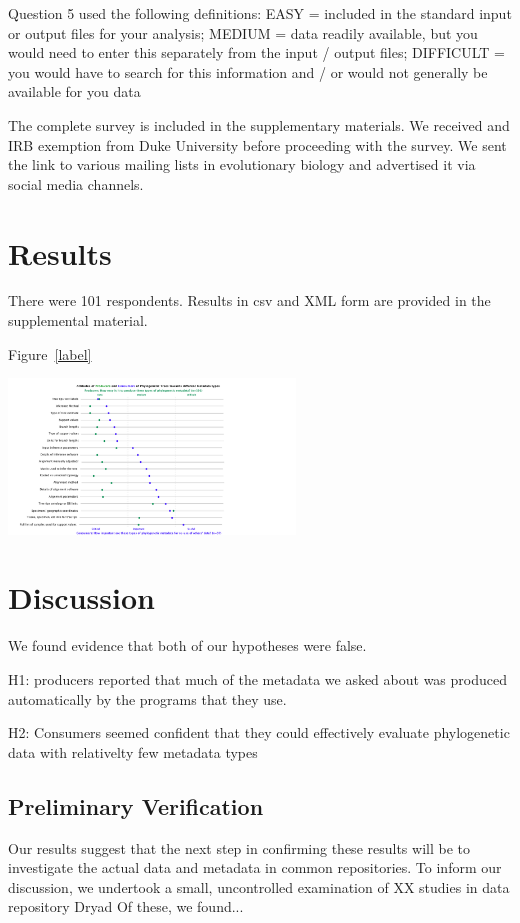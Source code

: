\documentclass[12pt]{scrartcl}
\newenvironment{Figure}
  {\par\medskip\noindent\minipage{\linewidth}}
  {\endminipage\par\medskip}
\begin{document}
\begin{multicols}{2}
Question 5 used the following definitions: EASY = included in the standard input or output files for your analysis; MEDIUM = data readily available, but you would need to enter this separately from the input / output files; DIFFICULT = you would have to search for this information and / or would not generally be available for you data

The complete survey is included in the supplementary materials. We received and IRB exemption from Duke University before proceeding with the survey. We sent the link to various mailing lists in evolutionary biology and advertised it via social media channels. 

\section{Results}
There were 101 respondents. Results in csv and XML form are provided in the supplemental material. 

Figure~\ref{label}
\begin{Figure}
	\includegraphics[width=3in]{rasters/OTOL graph - wide.png}
	\label{label}
\end{Figure}

\section{Discussion}
We found evidence that both of our hypotheses were false. 

H1: producers reported that much of the metadata we asked about was produced automatically by the programs that they use.

H2: Consumers seemed confident that they could effectively evaluate phylogenetic data with relativelty few metadata types

\subsection{Preliminary Verification}
Our results suggest that the next step in confirming these results will be to investigate the actual data and metadata in common repositories.  To inform our discussion, we undertook a small, uncontrolled examination of XX%
studies in data repository Dryad %
Of these, we found... %


\end{multicols}
\end{document}
